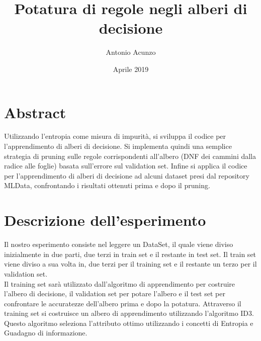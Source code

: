 \documentclass[]{article}
\newcommand{\subtitle}[1]{%
  \posttitle{%
    \par\end{center}
    \begin{center}\large#1\end{center}
    \vskip0.5em}%
}
\begin{document}
\title{Potatura di regole negli alberi di decisione}
\subtitle{Intelligenza Artificiale}
\author{Antonio Acunzo}
\date{Aprile 2019}
\maketitle

\section*{Abstract}  

Utilizzando l'entropia come misura di impurità, si sviluppa il codice per l'apprendimento di alberi di decisione. Si implementa quindi una semplice strategia di pruning sulle regole corrispondenti all'albero (DNF dei cammini dalla radice alle foglie) basata sull'errore sul validation set. Infine si applica il codice per l’apprendimento di alberi di decisione ad alcuni dataset presi dal repository MLData, confrontando i risultati ottenuti prima e dopo il pruning.

 


\section*{Descrizione dell'esperimento}

Il nostro esperimento consiste nel leggere un DataSet, il quale viene diviso inizialmente in due parti, due terzi in train set e il restante in test set. Il train set viene diviso a sua volta in, due terzi per il training set e il restante un terzo per il validation set. \\
Il training set sarà utilizzato dall'algoritmo di apprendimento per costruire l'albero di decisione, il validation set per potare l'albero e il test set per confrontare le accuratezze dell'albero prima e dopo la potatura. 
Attraverso il training set si costruisce un albero di apprendimento utilizzando l'algoritmo ID3. Questo algoritmo seleziona l'attributo ottimo utilizzando i concetti di Entropia e Guadagno di informazione.
\end{document}
